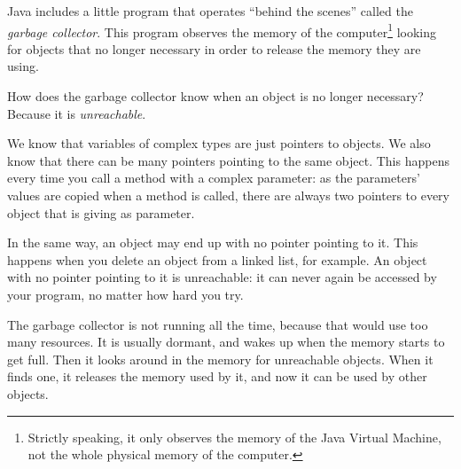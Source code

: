 Java includes a little program that operates ``behind the scenes''
called the \emph{garbage collector}. This program observes the memory
of the computer\footnote{Strictly speaking, it only observes the
  memory of the Java Virtual Machine, not the whole physical memory of
the computer.} looking for objects that no longer necessary in order
to release the memory they are using. 

How does the garbage collector know when an object is no longer
necessary? Because it is \emph{unreachable}. 

We know that variables of complex types are just pointers to
objects. We also know that there can be many pointers pointing to the
same object. This happens every time you call a method with a complex
parameter: as the parameters' values are copied when a method is
called, there are always two pointers to every object that is
giving as parameter. 


In the same way, an object may end up with no pointer pointing to
it. This happens when you delete an object from a linked list, for
example. An object with no pointer pointing to it is unreachable: it
can never again be accessed by your program, no matter how hard you
try. 

The garbage collector is not running all the time, because that would
use too many resources. It is usually dormant, and wakes up when the
memory starts to get full. Then it looks around in the memory for
unreachable objects. When it finds one, it releases the memory used by
it, and now it can be used by other objects. 

